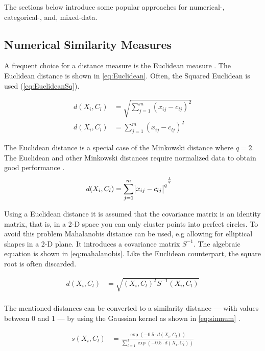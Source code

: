 \documentclass[../report.tex]{subfiles}
\begin{document}
The sections below introduce some popular approaches for numerical-, categorical-, and, mixed-data.

\subsection{Numerical Similarity Measures}

A frequent choice for a distance measure is the Euclidean measure \cite{Jain1999}. The Euclidean distance is shown in \ref{eq:Euclidean}. Often, the Squared Euclidean is used (\ref{eq:EuclideanSq}).

\begin{align}
  \label{eq:Euclidean}
  d(X_i,C_l) &= \sqrt{\sum^{m}_{j=1}(x_{ij} - c_{lj})^2} \\
  \label{eq:EuclideanSq}
  d(X_i,C_l) &= \sum^{m}_{j=1}(x_{ij} - c_{lj})^2
\end{align}

The Euclidean distance is a special case of the Minkowski distance where $q=2$. The Euclidean and other Minkowski distances require normalized data to obtain good performance \cite{Jain1999}. \begin{align}
  \label{eq:mikowski}
  d(X_i,C_l) &= {\sum^{m}_{j=1}\abs{x_{ij} - c_{lj}}^q}^{\frac{1}{q}}
\end{align}

Using a Euclidean distance it is assumed that the covariance matrix is an identity matrix, that is, in a 2-D space you can only cluster points into perfect circles. To avoid this problem Mahalanobis distance can be used, e.g allowing for elliptical shapes in a 2-D plane. It introduces a covariance matrix $S^{-1}$. The algebraic equation is shown in \ref{eq:mahalanobis}. Like the Euclidean counterpart, the square root is often discarded. 

\begin{align}
  \label{eq:mahalanobis}
  d(X_i,C_l) &= \sqrt{(X_i, C_l)^T S^{-1} (X_i, C_l)} \\
\end{align}

The mentioned distances can be converted to a similarity distance --- with values between 0 and 1 --- by using the Gaussian kernel as shown in \ref{eq:simnum} \cite{Cheung2013}.

\begin{align}
  \label{eq:simnum}
    s(X_i,C_l) &= \frac{\exp(-0.5 \cdot d(X_i,C_l))}{\sum^k_{t=1}\exp(-0.5 \cdot d(X_i,C_t))}
\end{align}
\end{document}
